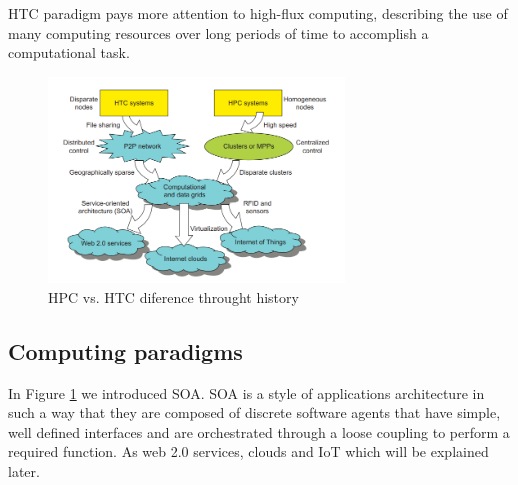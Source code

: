 \documentclass[12pt]{report}
\begin{document}
	HTC paradigm pays more attention to high-flux computing, describing the use of many computing resources over long periods of time to accomplish a computational task.
\begin{figure}[ht]
\centering
     \includegraphics[width=0.7\textwidth]{img1.png}
      \caption{HPC vs. HTC diference throught history}
       \label{img1}
\end{figure} 
    
    \subsection{Computing paradigms}
    	In Figure \ref{img1} we introduced SOA. SOA is a style of applications architecture in such a way that they are composed of discrete software agents that have simple, well defined interfaces and are orchestrated through a loose coupling to perform a required function.
        As web 2.0 services, clouds and IoT which will be explained later.
\end{document}
